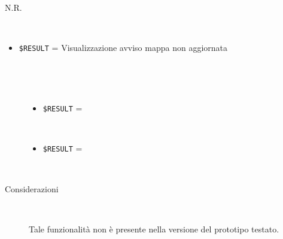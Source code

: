 \documentclass[../../Sperimentazione.tex]{subfiles}
\begin{document}
	
	\newpage	
			\paragraph*{}	
			\label{Prova6A.1}
			\begin{tcolorbox}[fonttitle=\bfseries, 
								adjusted title={\Large Prova 6A.1}, 
								breakable, 
								sharp corners=south,
								colback=white, 
								colframe=white!60!black]
								
				\begin{description}[leftmargin=0.7cm,labelwidth=!]
				
					\item[Input] \ \par 
        				N.R.
        			\tcbline 
        				
        			\item[Output atteso] \ \par
        				\begin{itemize}
        					\item \verb|$RESULT| = Visualizzazione avviso mappa non aggiornata
        				\end{itemize}

					\tcbline        				
        				
        			\item[Output riscontrato] \ \par
        				\begin{description}
        				
        					\item[\dispositivoA] \ \par
        					\begin{itemize}
        						\item \verb|$RESULT| = \ns
        					\end{itemize}      					
        					
        					\item[\dispositivoB] \ \par
        					\begin{itemize}
        						\item \verb|$RESULT| = \ns
        					\end{itemize}
        					
        				\end{description}
        				
        			\tcbline
        			
        			\item[Analisi risultati] \ \par
        				\begin{description}
        					\item[Considerazioni] \ \par
        						Tale funzionalità non è presente nella versione del prototipo testato.
        					

\end{description}
\end{description}
\end{tcolorbox}
\end{document}
